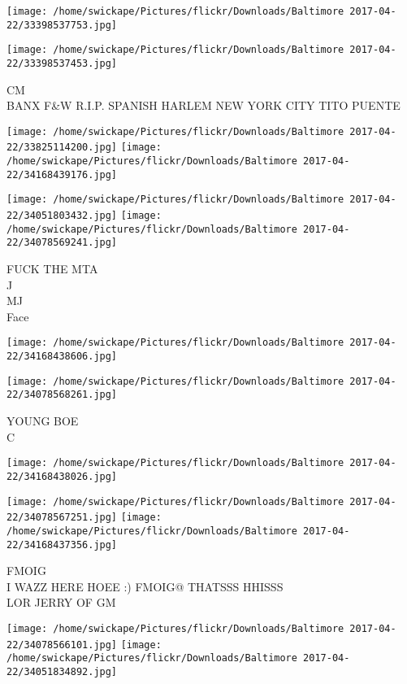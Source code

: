 \documentclass[10pt,letterpaper]{article}
\begin{document}
\texttt{[image: /home/swickape/Pictures/flickr/Downloads/Baltimore 2017-04-22/33398537753.jpg]}

\vspace{0.25in}
\texttt{[image: /home/swickape/Pictures/flickr/Downloads/Baltimore 2017-04-22/33398537453.jpg]}

CM\\
BANX F\&W R.I.P. SPANISH HARLEM NEW YORK CITY TITO PUENTE\\
\pagebreak

\texttt{[image: /home/swickape/Pictures/flickr/Downloads/Baltimore 2017-04-22/33825114200.jpg]}
\texttt{[image: /home/swickape/Pictures/flickr/Downloads/Baltimore 2017-04-22/34168439176.jpg]}

\texttt{[image: /home/swickape/Pictures/flickr/Downloads/Baltimore 2017-04-22/34051803432.jpg]}
\texttt{[image: /home/swickape/Pictures/flickr/Downloads/Baltimore 2017-04-22/34078569241.jpg]}

FUCK THE MTA\\
J\\
MJ\\
Face\\
\pagebreak

\texttt{[image: /home/swickape/Pictures/flickr/Downloads/Baltimore 2017-04-22/34168438606.jpg]}

\vspace{0.25in}
\texttt{[image: /home/swickape/Pictures/flickr/Downloads/Baltimore 2017-04-22/34078568261.jpg]}

YOUNG BOE\\
C\\
\pagebreak

\texttt{[image: /home/swickape/Pictures/flickr/Downloads/Baltimore 2017-04-22/34168438026.jpg]}

\vspace{0.25in}
\texttt{[image: /home/swickape/Pictures/flickr/Downloads/Baltimore 2017-04-22/34078567251.jpg]}
\texttt{[image: /home/swickape/Pictures/flickr/Downloads/Baltimore 2017-04-22/34168437356.jpg]}

FMOIG\\
I WAZZ HERE HOEE :) FMOIG@ THATSSS HHISSS\\
LOR JERRY OF GM\\
\pagebreak

\texttt{[image: /home/swickape/Pictures/flickr/Downloads/Baltimore 2017-04-22/34078566101.jpg]}
\texttt{[image: /home/swickape/Pictures/flickr/Downloads/Baltimore 2017-04-22/34051834892.jpg]}
\end{document}
